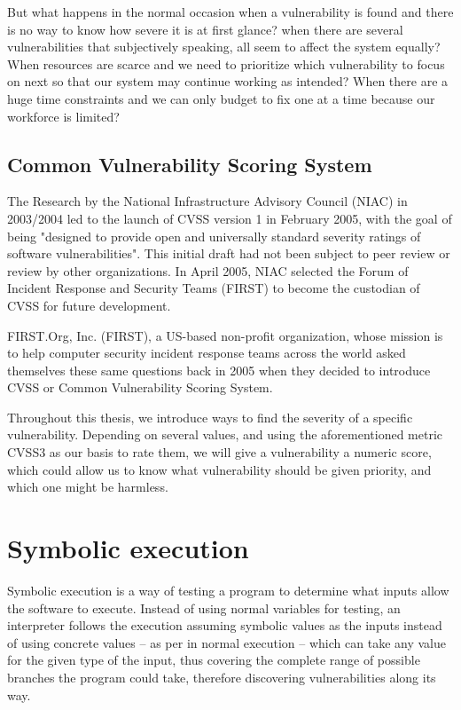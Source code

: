 But what happens in the normal occasion when a vulnerability is found and there is no way to know how severe it is at first glance? when there are several vulnerabilities that subjectively speaking, all seem to affect the system equally? When resources are scarce and we need to prioritize which vulnerability to focus on next so that our system may continue working as intended?
When there are a huge time constraints and we can only budget to fix one at a time because our workforce is limited?

\subsection{Common Vulnerability Scoring System}

The Research by the National Infrastructure Advisory Council (NIAC) in 2003/2004 led to the launch of CVSS version 1 in February 2005, with the goal of being "designed to provide open and universally standard severity ratings of software vulnerabilities". This initial draft had not been subject to peer review or review by other organizations. In April 2005, NIAC selected the Forum of Incident Response and Security Teams (FIRST) to become the custodian of CVSS for future development. 

FIRST.Org, Inc. (FIRST), a US-based non-profit organization, whose mission is to help computer security incident response teams across the world\parencite{cvss3} asked themselves these same questions back in 2005 when they decided to introduce CVSS or Common Vulnerability Scoring System\parencite{cvss3}.

Throughout this thesis, we introduce ways to find the severity of a specific vulnerability. Depending on several values, and using the aforementioned metric CVSS3 as our basis to rate them, we will give a vulnerability a numeric score, which could allow us to know what vulnerability should be given priority, and which one might be harmless.

\section{Symbolic execution}

Symbolic execution is a way of testing a program to determine what inputs allow the software to execute. Instead of using normal variables for testing, an interpreter follows the execution assuming symbolic values as the inputs instead of using concrete values -- as per in normal execution -- which can take any value for the given type of the input, thus covering the complete range of possible branches the program could take, therefore discovering vulnerabilities along its way.


